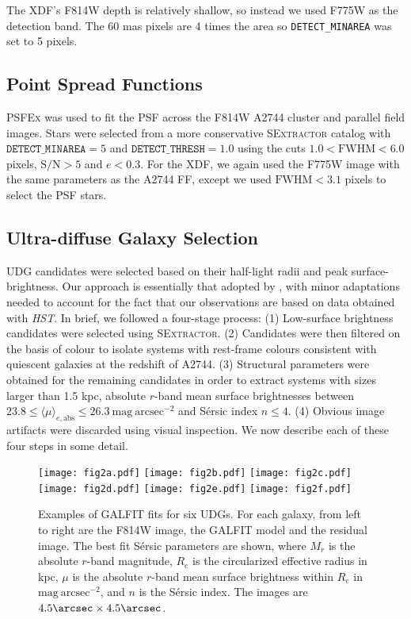 \documentclass[iop,tighten,twocolumn,apj]{emulateapj}
\begin{document}
The XDF's F814W depth is relatively shallow, so instead we used F775W as the
detection band. The 60 mas pixels are 4 times the area so
\texttt{DETECT\_MINAREA} was set to 5 pixels.

\subsection{Point Spread Functions}

\textsc{PSFEx} \citep{bertin2011} was used to fit the PSF across the F814W
A2744 cluster and parallel field images. Stars were selected from a more
conservative \textsc{SExtractor} catalog with $\mathtt{DETECT\_MINAREA} = 5$
and $\mathtt{DETECT\_THRESH} = 1.0$ using the cuts $1.0 < \mathrm{FWHM} < 6.0$
pixels, $\mathrm{S/N} > 5$ and $e < 0.3$.  For the XDF, we again used the
F775W image with the same parameters as the A2744 FF, except we used
$\mathrm{FWHM} < 3.1$ pixels to select the PSF stars.
 
\subsection{Ultra-diffuse Galaxy Selection} \label{sec:udg_selection}

UDG candidates were selected based on their half-light radii and peak
surface-brightness.  Our approach is essentially that adopted by
\cite[][hereafter vdB16]{vdb2016}, with minor adaptations needed to account
for the fact that our observations are based on data obtained with
\textit{HST}. In brief, we followed a four-stage process: (1)
Low-surface brightness candidates were selected using
\textsc{SExtractor}. (2) Candidates were then filtered on the basis of
colour to isolate systems with rest-frame colours consistent with
quiescent galaxies at the redshift of A2744.  (3) Structural
parameters were obtained for the remaining candidates in order to
extract systems with sizes larger than 1.5 kpc, absolute $r$-band mean
surface brightnesses between $23.8 \leq \langle\mu\rangle_{e,\mathrm{abs}}
\leq 26.3~\mathrm{mag}~\mathrm{arcsec}^{-2}$ and S\'ersic index $n \leq
4$.  (4) Obvious image artifacts were discarded using visual
inspection. We now describe each of these four steps in some detail.

\begin{figure*}
	\texttt{[image: fig2a.pdf]}
	\texttt{[image: fig2b.pdf]}
	\texttt{[image: fig2c.pdf]}
	\texttt{[image: fig2d.pdf]}
	\texttt{[image: fig2e.pdf]}
	\texttt{[image: fig2f.pdf]}
	\caption{
	Examples of GALFIT fits for six UDGs. For each galaxy, from left to
	right are the F814W image, the GALFIT model and the residual image.
	The best fit S\'ersic parameters are shown, where $M_r$ is the
	absolute $r$-band magnitude, $R_e$ is the circularized effective
	radius in kpc, $\mu$ is the absolute $r$-band mean surface brightness
	within $R_e$ in $\mathrm{mag}~\mathrm{arcsec}^{-2}$, and $n$ is the
	S\'ersic index.  The images are $4.5\arcsec \times 4.5\arcsec$.
	\label{fig:stamps}
	}
\end{figure*}
\end{document}
